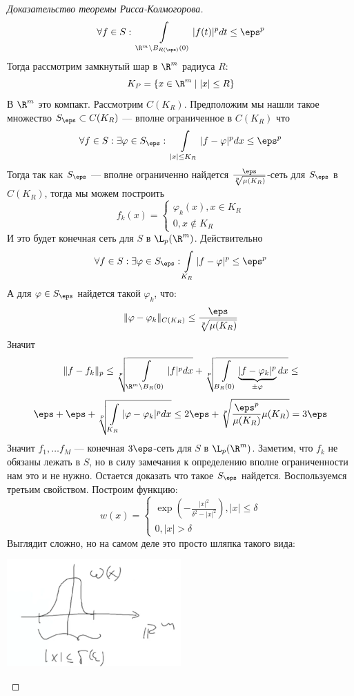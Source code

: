 \begin{proof}[Доказательство теоремы Рисса-Колмогорова]
	$$
	\forall f \in S: \ \int\limits_{\R^m \setminus B_{R(\eps)}(0)} |f(t)|^pdt \leq \eps^p
	$$
	Тогда рассмотрим замкнутый шар в $\R^m$ радиуса $R$:
	$$
	K_P = \{x \in \R^m \mid |x| \leq R\}
	$$
	В $\R^m$ это компакт. Рассмотрим $C(K_R)$. Предположим мы нашли такое множество $S_\eps \subset C(K_R)$ --- вполне ограниченное в $C(K_R)$  что
	$$
	\forall f \in S: \exists \varphi \in S_\eps: \ \int\limits_{|x| \leq K_R} |f - \varphi|^p dx \leq \eps^p
	$$
	Тогда так как $S_\eps$ --- вполне ограниченно найдется $\frac{\eps}{\sqrt[p]{\mu (K_R)}}$-сеть для $S_\eps$ в $C(K_R)$, тогда мы можем построить 
	$$
	f_k(x) = \begin{cases}
		\varphi_k(x), x \in K_R \\
		0, x \notin K_R
	\end{cases}
	$$
	И это будет конечная сеть для $S$ в $\L_p(\R^m)$. Действительно 
	$$
	\forall f \in S: \exists \varphi \in S_\eps : \int\limits_{K_R}|f-\varphi|^p \leq \eps^p
	$$
	А для $\varphi \in S_\eps$ найдется такой $\varphi_k$, что:
	$$
	\|\varphi - \varphi_k\|_{C(K_R)} \leq \frac{\eps}{\sqrt[p]{\mu(K_R)}}
	$$
	Значит
	$$
	\|f - f_k\|_p \leq \sqrt[p]{\int\limits_{\R^m \setminus B_{R}(0)} |f|^p dx} + \sqrt[p]{\int\limits_{B_{R}(0)}\underbrace{|f - \varphi_k|^p}_{\pm \varphi}dx} \leq 
	$$
	$$
	\eps + \eps + \sqrt[p]{\int\limits_{K_R} |\varphi - \varphi_k|^p dx} \leq 2\eps + \sqrt[p]{\frac{\eps^p}{\mu(K_R)}\mu(K_R)} = 3\eps
	$$
	Значит $f_1, \dots f_M$ --- конечная $3\eps$-сеть для $S$ в $\L_p(\R^m)$. Заметим, что $f_k$ не обязаны лежать в $S$, но в силу замечания к определению вполне ограниченности нам это и не нужно.
	Остается доказать что такое $S_\eps$ найдется. Воспользуемся третьим свойством.  
	Построим функцию: 
		$$
	w (x) = \begin{cases}
		\exp \left( - \frac{|x|^2}{\delta^2 - |x|^2}\right), |x| \leq \delta \\
		0, |x| > \delta
	\end{cases}
	$$	
	Выглядит сложно, но на самом деле это просто шляпка такого вида:
	\begin{center}
		\includegraphics[width=0.5\textwidth]{pic/omega}
	\end{center}

\end{proof}
